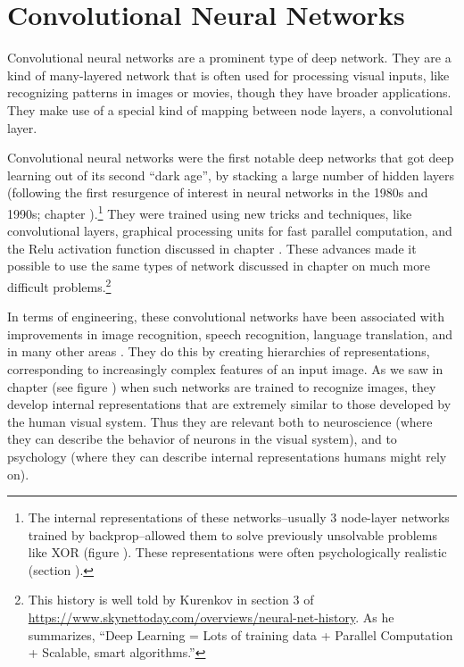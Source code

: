 \chapter{Convolutional Neural Networks}\label{ch_cnn}


Convolutional neural networks are a prominent type of deep network. They are a kind of many-layered network that is often used for processing visual inputs, like recognizing patterns in images or movies, though they have broader applications. They make use of a special kind of mapping between node layers, a convolutional layer. 

Convolutional neural networks were the first notable deep networks that got deep learning out of its second ``dark age'', by stacking a large number of hidden layers (following the first resurgence of interest in neural networks in the 1980s and 1990s; chapter ).\footnote{The internal representations of these networks--usually 3 node-layer networks trained by backprop--allowed them to solve previously unsolvable problems like XOR (figure ). These representations were often psychologically realistic (section ).} They were trained using new tricks and techniques, like convolutional layers, graphical processing units for fast parallel computation, and the Relu activation function discussed in chapter . These advances made it possible to use the same types of network discussed in chapter  on much more difficult problems.\footnote{This history is well told by Kurenkov in section 3 of \url{https://www.skynettoday.com/overviews/neural-net-history}. As he summarizes, ``Deep Learning = Lots of training data + Parallel Computation + Scalable, smart algorithms.''}

In terms of engineering, these convolutional networks have been associated with improvements in image recognition, speech recognition, language translation, and in many other areas \cite{lecun2015deep, goodfellow2016deep}. They do this by creating hierarchies of representations, corresponding  to increasingly complex features of an input image. As we saw in chapter  (see figure ) when such networks are trained to recognize images, they develop internal representations that are extremely similar to those developed by the human visual  system. Thus they are relevant both to neuroscience (where they can describe the behavior of neurons in the visual system), and to psychology (where they can describe internal representations humans might rely on).

